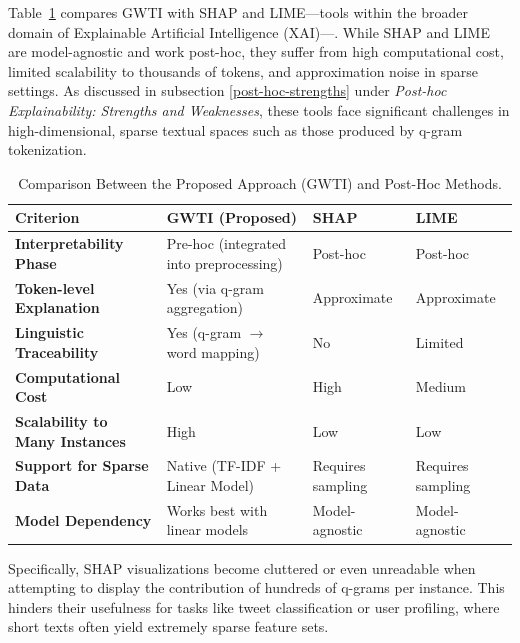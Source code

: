\documentclass[runningheads,10pt]{llncs}
\begin{document}
Table~\ref{tab:comparison_methods} compares \ac{GWTI} with \ac{SHAP} and \ac{LIME}—tools within the broader domain of Explainable Artificial Intelligence (XAI)—. While \ac{SHAP} and \ac{LIME} are model-agnostic and work post-hoc, they suffer from high computational cost, limited scalability to thousands of tokens, and approximation noise in sparse settings. As discussed in subsection \ref{post-hoc-strengths} under \textit{Post-hoc Explainability: Strengths and Weaknesses}, these tools face significant challenges in high-dimensional, sparse textual spaces such as those produced by q-gram tokenization.

\begin{table}[ht]
    \centering
    \begin{tabular}{p{5cm}p{5cm}p{2cm}p{2cm}}
        \toprule
            \textbf{Criterion} & \textbf{GWTI (Proposed)} & \textbf{SHAP} & \textbf{LIME} \\
        \midrule
            \textbf{Interpretability Phase} & Pre-hoc (integrated into preprocessing) & Post-hoc & Post-hoc \\
            \textbf{Token-level Explanation} & Yes (via q-gram aggregation) & Approximate & Approximate \\
            \textbf{Linguistic Traceability} & Yes (q-gram $\rightarrow$ word mapping) & No & Limited \\
            \textbf{Computational Cost} & Low & High & Medium \\
            \textbf{Scalability to Many Instances} & High & Low & Low \\
            \textbf{Support for Sparse Data} & Native (TF-IDF + Linear Model) & Requires sampling & Requires sampling \\
            \textbf{Model Dependency} & Works best with linear models & Model-agnostic & Model-agnostic \\
        \bottomrule
    \end{tabular}
    \caption{Comparison Between the Proposed Approach (\ac{GWTI}) and Post-Hoc Methods. }
    \label{tab:comparison_methods}
\end{table}


Specifically, \ac{SHAP} visualizations become cluttered or even unreadable when attempting to display the contribution of hundreds of q-grams per instance. This hinders their usefulness for tasks like tweet classification or user profiling, where short texts often yield extremely sparse feature sets.
\end{document}
